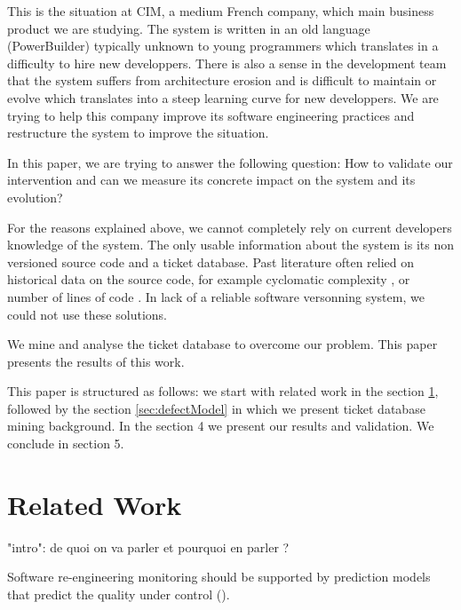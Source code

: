 \documentclass[10pt,conference]{IEEEtran}
\begin{document}
This is the situation at CIM, a medium French company, which main business product we are studying.
The system is written in an old language (PowerBuilder) typically unknown to young programmers which translates in a difficulty to hire new developpers.
There is also a sense in the development team that the system suffers from architecture erosion and is difficult to maintain or evolve which translates into a steep learning curve for new developpers.
We are trying to help this company improve its software engineering practices and restructure the system to improve the situation.

In this paper, we are trying to answer the following question:
How to validate our intervention and can we measure its concrete impact on the system and its evolution?

For the reasons explained above, we cannot completely rely on current developers knowledge of the system.
The only usable information about the system is its non versioned source code and a ticket database.
Past literature often relied on historical data on the source code, for example
cyclomatic complexity \cite{gill91}, or number of lines of code \cite{port18}.
In lack of a reliable software versonning system, we could not use these solutions.

We mine and analyse the ticket database to overcome our problem.
This paper presents the results of this work.

 This paper is structured as follows: we start with related work in the section \ref{sec:related-work}, followed by  the section \ref{sec:defectModel}  in which we present ticket database mining background. 
 In the section 4 we present our results and validation. We  conclude in section 5.
 
\section{Related Work}
\label{sec:related-work}

"intro": de quoi on va parler et pourquoi en parler ?

Software re-engineering monitoring should be supported by prediction models that predict the quality under control (\cite{Lenar17}). 
\end{document}
